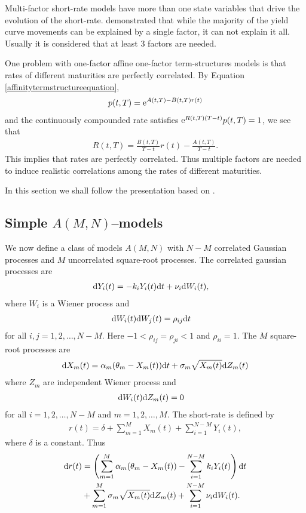 Multi-factor short-rate models have more than one state variables that drive the evolution of the short-rate. \textcite{litterman1991common} demonstrated that while the majority of the yield curve movements can be explained by a single factor, it can not explain it all. Usually it is considered that at least 3 factors are needed.

One problem with one-factor affine one-factor term-structures models is that rates of different maturities are perfectly correlated. By Equation \ref{affinitytermstructureequation},
\begin{align}
p(t,T) = \mathrm{e}^{A(t,T) - B(t,T)r(t)}
\end{align}
and the continuously compounded rate satisfies $\mathrm{e}^{R(t,T)(T-t)} p(t,T) = 1$, we see that
\begin{align}
	R(t,T) = \frac{B(t,T)}{T-t} r(t) - \frac{A(t,T)}{T-t} .
\end{align}
This implies that rates are perfectly correlated. Thus multiple factors are needed to induce realistic correlations among the rates of different maturities.

In this section we shall follow the presentation based on \textcite[pp. 425--435]{nawalkabeliaevasoto2007dynamic}.

\subsection{Simple $A(M,N)$--models}
\label{subsec-AMN-interestrate}

We now define a class of models $A(M,N)$ with $N-M$ correlated Gaussian processes and $M$ uncorrelated square-root processes. The correlated gaussian processes are
\begin{align}
\mathrm{d} Y_i(t) &= - k_i Y_i(t) \mathrm{d} t + \nu_i \mathrm{d} W_i (t),
\end{align}
where $W_i$ is a Wiener process and 
\begin{align}
\mathrm{d} W_i (t) \mathrm{d} W_j (t) &= \rho_{ij} \mathrm{d} t    
\end{align}
for all $i,j = 1,2, \ldots, N-M$. Here $-1 < \rho_{ij} = \rho_{ji} < 1$ and $\rho_{ii} = 1$. The $M$ square-root processes are
\begin{align}
\mathrm{d} X_m(t) = \alpha_m ( \theta_m - X_m(t) ) \mathrm{d} t + \sigma_m \sqrt{ X_m(t) } \mathrm{d} Z_m (t)
\end{align}
where $Z_m$ are independent Wiener process and
\begin{align}
\mathrm{d} W_i (t) \mathrm{d} Z_m (t) &= 0    
\end{align}
for all $i = 1,2, \ldots, N-M$ and $m = 1,2, \ldots, M$. The short-rate is defined by
\begin{align}
r(t) = \delta + \sum_{m=1}^{M} X_m(t) + \sum_{i=1}^{N-M} Y_i(t),
\end{align}
where $\delta$ is a constant. Thus
\begin{align}
\mathrm{d} r(t) &= \left( \sum_{m=1}^{M} \alpha_m ( \theta_m - X_m(t) ) - \sum_{i=1}^{N-M} k_i Y_i(t) \right) \mathrm{d} t \\
&+ \sum_{m=1}^{M} \sigma_m \sqrt{ X_m(t) } \mathrm{d} Z_m (t) + \sum_{i=1}^{N-M} \nu_i \mathrm{d} W_i (t) .
\end{align}


